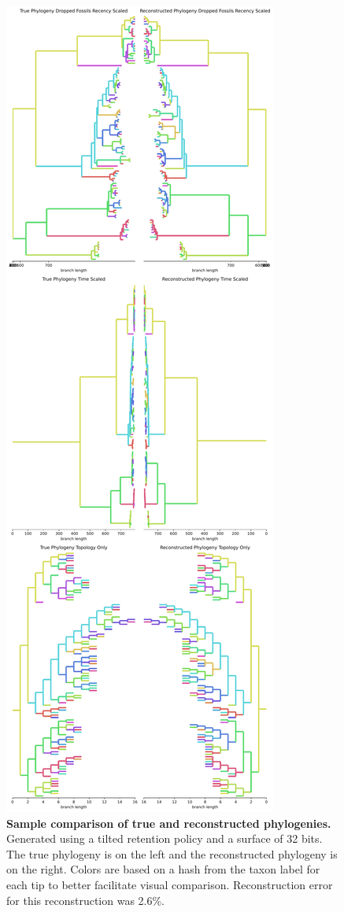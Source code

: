 \begin{figure}[h]
\includegraphics[width=\columnwidth,trim={0 52cm 0 0.8cm},clip]{img/colorclade.pdf}
\caption{\textbf{Sample comparison of true and reconstructed phylogenies.}
\small 
Generated using a tilted retention policy and a surface of 32 bits. The true phylogeny is on the left and the reconstructed phylogeny is on the right. Colors are based on a hash from the taxon label for each tip to better facilitate visual comparison. Reconstruction error for this reconstruction was 2.6\%.
}
\label{fig:colorclade}
\end{figure}
